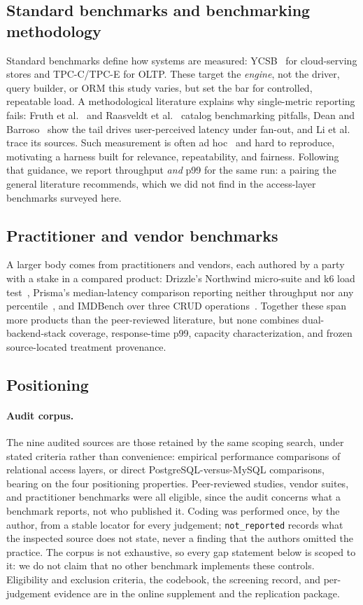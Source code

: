 \subsection{Standard benchmarks and benchmarking methodology}
Standard benchmarks define how systems are measured: YCSB~\cite{cooper2010ycsb} for cloud-serving
stores and TPC-C/TPC-E for OLTP. These target the \emph{engine}, not the driver, query builder, or ORM
this study varies, but set the bar for controlled, repeatable load. A methodological literature
explains why single-metric reporting fails: Fruth et al.~\cite{fruth2022tail} and Raasveldt et
al.~\cite{raasveldt2018fair} catalog benchmarking pitfalls, Dean and Barroso~\cite{dean2013tail} show
the tail drives user-perceived latency under fan-out, and Li et al.~\cite{li2014tales} trace its
sources. Such measurement is often ad hoc~\cite{leitner2017exploratory} and hard to reproduce, motivating a harness built for relevance, repeatability, and fairness. Following that guidance, we report
throughput \emph{and} p99 for the same run: a pairing the general literature recommends, which we did
not find in the access-layer benchmarks surveyed here.

\subsection{Practitioner and vendor benchmarks}
A larger body comes from practitioners and vendors, each authored by a party with a stake in a
compared product: Drizzle's Northwind micro-suite and k6 load test~\cite{drizzle_benchmarks},
Prisma's median-latency comparison reporting neither throughput nor any
percentile~\cite{prisma_benchmarks}, and IMDBench over three CRUD operations~\cite{imdbench}.
Together these span more products than the peer-reviewed literature, but none combines
dual-backend-stack coverage, response-time p99, capacity characterization, and frozen
source-located treatment provenance.

\subsection{Positioning}
\paragraph{Audit corpus.} The nine audited sources are those retained by the same scoping search,
under stated criteria rather than convenience: empirical performance comparisons of relational
access layers, or direct PostgreSQL-versus-MySQL comparisons, bearing on the four positioning
properties. Peer-reviewed studies, vendor suites, and practitioner benchmarks were all eligible,
since the audit concerns what a benchmark reports, not who published it. Coding was performed once,
by the author, from a stable locator for every judgement; \texttt{not\_reported} records what the
inspected source does not state, never a finding that the authors omitted the practice. The corpus
is not exhaustive, so every gap statement below is scoped to it: we do not claim that no other
benchmark implements these controls. Eligibility and exclusion criteria, the codebook, the
screening record, and per-judgement evidence are in the online supplement and the replication
package.


